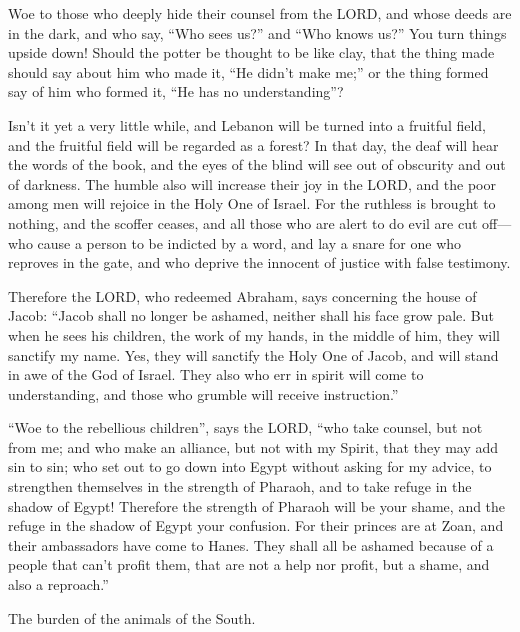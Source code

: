 \myverse{}Woe to those who deeply hide their counsel from the LORD, and
whose deeds are in the dark, and who say, “Who sees us?” and “Who knows us?”
\myverse{}You turn things upside down! Should the potter be thought to be like clay,
that the thing made should say about him who made it, “He didn’t make me;” or the thing formed say of
him who formed it, “He has no understanding”?

\myverse{}Isn’t it yet a very little while, and Lebanon will be turned
into a fruitful field, and the fruitful field will be regarded as a forest?
\myverse{}In that day, the deaf will hear the words of the book, and the eyes of the
blind will see out of obscurity and out of darkness.
\myverse{}The humble also will increase their joy in the LORD, and the poor among men
will rejoice in the Holy One of Israel.
\myverse{}For the ruthless is brought to nothing, and the scoffer ceases, and all those
who are alert to do evil are cut off—
\myverse{}who cause a person to be indicted by a word, and lay a snare for one who
reproves in the gate, and who deprive the innocent of justice with false testimony.

\myverse{}Therefore the LORD, who redeemed Abraham, says concerning the
house of Jacob: “Jacob shall no longer be ashamed, neither shall his face grow pale.
\myverse{}But when he sees his children, the work of my hands, in the middle of him,
they will sanctify my name. Yes, they will sanctify the Holy One of Jacob, and will stand in awe of the
God of Israel.
\myverse{}They also who err in spirit will come to understanding, and those who grumble
will receive instruction.”


\mychapter{} \myverse*{}“Woe to the rebellious children”, says the LORD, “who take counsel,
but not from me; and who make an alliance, but not with my Spirit, that they may add sin to sin;
\myverse{}who set out to go down into Egypt without asking for my advice, to strengthen
themselves in the strength of Pharaoh, and to take refuge in the shadow of Egypt!
\myverse{}Therefore the strength of Pharaoh will be your shame, and the refuge in the
shadow of Egypt your confusion.
\myverse{}For their princes are at Zoan, and their ambassadors have come to Hanes.
\myverse{}They shall all be ashamed because of a people that can’t profit them, that
are not a help nor profit, but a shame, and also a reproach.”

\myverse{}The burden of the animals of the South.

